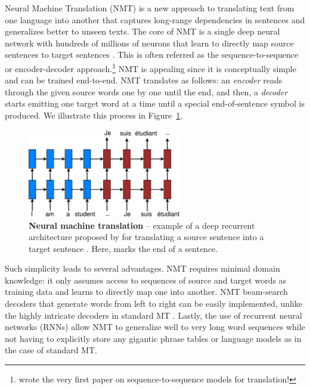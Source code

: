 Neural Machine Translation (NMT) is a new approach to translating text from one
language into another that captures long-range dependencies in sentences and
generalizes better to unseen texts. The core of NMT is a single deep neural
network with hundreds of millions of neurons that learn to directly map source
sentences to target sentences \cite{kal13,sutskever14,cho14}. 
This is often referred as the sequence-to-sequence or encoder-decoder
approach.\footnote{ wrote the very first paper on sequence-to-sequence models for translation!}
NMT is appealing since it is conceptually
simple and can be trained
end-to-end. NMT translates as follows: an {\it encoder} reads through the given source
words one by one until the
end, and then, a {\it decoder} starts emitting one target
word at a time until a special end-of-sentence symbol is produced. We illustrate
this process in Figure~\ref{f:nmt}. 

\begin{figure}[tbh!]
\centering
\includegraphics[width=0.6\textwidth, clip=true, trim= 0 0 0 0]{img/nmt_basic} %
\caption[Neural machine translation]{{\bf Neural machine translation} -- example of a deep recurrent
architecture proposed by  for
translating a source sentence  into a target sentence
. Here, \word{\texttt{\_}} marks the end of a sentence.
} 
\label{f:nmt}
\end{figure}

Such simplicity leads to several advantages. 
NMT requires minimal domain knowledge: it only assumes access to
sequences of source and target words as training data and learns to directly
map one into another. NMT beam-search decoders that
generate words from left to right can be easily implemented, unlike the highly
intricate decoders in standard MT \cite{Koehn:2003:SMT}. Lastly, the use of
recurrent neural networks (RNNs) allow NMT to generalize well to very long word
sequences while not having to 
explicitly store any gigantic
phrase tables or language models as in the case of standard MT.

